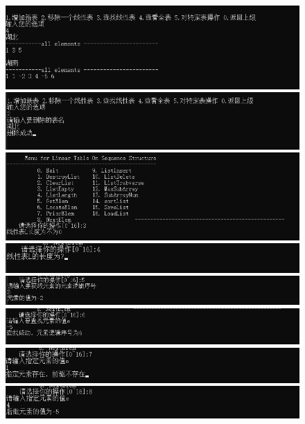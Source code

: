 \documentclass[supercite]{Experimental_Report}
\theoremstyle{definition}
\begin{document}
\begin{sloppypar}
\begin{figure}[H]
    \centering
    \includegraphics[width=16cm]{pic1//1.png}
    \includegraphics[width=16cm]{pic1//2.png}
    \includegraphics[width=16cm]{pic1//3.png}
    \includegraphics[width=16cm]{pic1//4.png}
	\includegraphics[width=16cm]{pic1//5.png}
	\includegraphics[width=16cm]{pic1//6.png}
	\includegraphics[width=16cm]{pic1//7.png}
	\includegraphics[width=16cm]{pic1//8.png}

\end{figure} 


\end{sloppypar}
\end{document}
